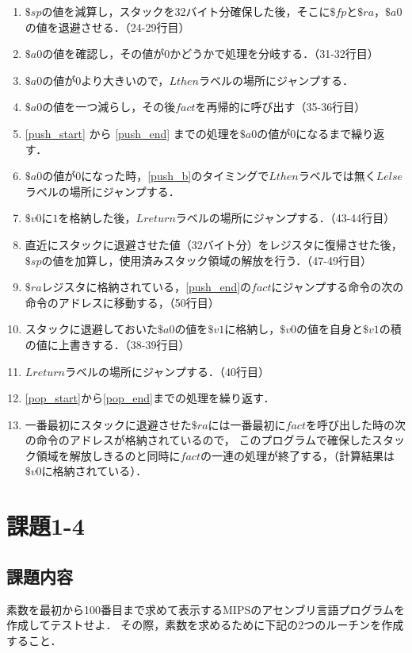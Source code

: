 \documentclass[a4j,11pt]{jarticle}
\begin{document}
\begin{enumerate}
      \item \label{push_start} $\$sp$の値を減算し，スタックを32バイト分確保した後，そこに$\$fp$と$\$ra$，$\$a0$の値を退避させる．（24-29行目）
      \item $\$a0$の値を確認し，その値が$0$かどうかで処理を分岐する．（31-32行目）
      \item \label{push_b}$\$a0$の値が$0$より大きいので，$Lthen$ラベルの場所にジャンプする．
      \item \label{push_end}$\$a0$の値を一つ減らし，その後$fact$を再帰的に呼び出す（35-36行目）
      \item \ref{push_start} から \ref{push_end} までの処理を$\$a0$の値が$0$になるまで繰り返す．
      \item $\$a0$の値が$0$になった時，\ref{push_b}のタイミングで$Lthen$ラベルでは無く$Lelse$ラベルの場所にジャンプする．
      \item $\$v0$に$1$を格納した後，$Lreturn$ラベルの場所にジャンプする．（43-44行目）
      \item \label{pop_start}直近にスタックに退避させた値（32バイト分）をレジスタに復帰させた後，$\$sp$の値を加算し，使用済みスタック領域の解放を行う．（47-49行目）
      \item $\$ra$レジスタに格納されている，\ref{push_end}の$fact$にジャンプする命令の次の命令のアドレスに移動する，（50行目）
      \item スタックに退避しておいた$\$a0$の値を$\$v1$に格納し，$\$v0$の値を自身と$\$v1$の積の値に上書きする．（38-39行目）
      \item \label{pop_end}$Lreturn$ラベルの場所にジャンプする．（40行目）
      \item \ref{pop_start}から\ref{pop_end}までの処理を繰り返す．
      \item 一番最初にスタックに退避させた$\$ra$には一番最初に$fact$を呼び出した時の次の命令のアドレスが格納されているので，
      このプログラムで確保したスタック領域を解放しきるのと同時に$fact$の一連の処理が終了する，（計算結果は$\$v0$に格納されている）．
\end{enumerate}

\section{課題1-4}
\subsection{課題内容}
素数を最初から100番目まで求めて表示するMIPSのアセンブリ言語プログラムを作成してテストせよ． 
その際，素数を求めるために下記の2つのルーチンを作成すること．
\end{document}
